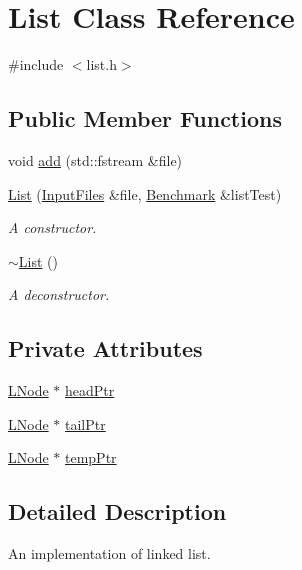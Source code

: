 \hypertarget{class_list}{}\section{List Class Reference}
\label{class_list}


{\ttfamily \#include $<$list.\+h$>$}

\subsection*{Public Member Functions}
\begin{DoxyCompactItemize}
\item 
void \hyperlink{class_list_a2356cce9e60410b48020bca33c661032}{add} (std\+::fstream \&file)
\item 
\hyperlink{class_list_a0b116ff5e92f7289b1bd9b8b1e66a8e3}{List} (\hyperlink{class_input_files}{Input\+Files} \&file, \hyperlink{class_benchmark}{Benchmark} \&list\+Test)
\begin{DoxyCompactList}\small\item\em A constructor. \end{DoxyCompactList}\item 
\hyperlink{class_list_a70aecf37bd9d779a394e4d50377fbf5f}{$\sim$\+List} ()
\begin{DoxyCompactList}\small\item\em A deconstructor. \end{DoxyCompactList}\end{DoxyCompactItemize}
\subsection*{Private Attributes}
\begin{DoxyCompactItemize}
\item 
\hyperlink{class_l_node}{L\+Node} $\ast$ \hyperlink{class_list_a5610353d95d627beab38b7366921e0c3}{head\+Ptr}
\item 
\hyperlink{class_l_node}{L\+Node} $\ast$ \hyperlink{class_list_a73c6ff858ccd116181acc4795bd1ed58}{tail\+Ptr}
\item 
\hyperlink{class_l_node}{L\+Node} $\ast$ \hyperlink{class_list_a9a3a51357cab8c53233ba00b8545eb5a}{temp\+Ptr}
\end{DoxyCompactItemize}


\subsection{Detailed Description}
An implementation of linked list. 

